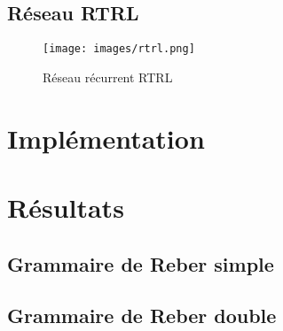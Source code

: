 \subsection{Réseau RTRL}

\begin{figure}[!ht]
\begin{center}
\texttt{[image: images/rtrl.png]}
\end{center}
\caption{Réseau récurrent RTRL}
\end{figure}

\section{Implémentation}

\section{Résultats}
\subsection{Grammaire de Reber simple}
\subsection{Grammaire de Reber double}
